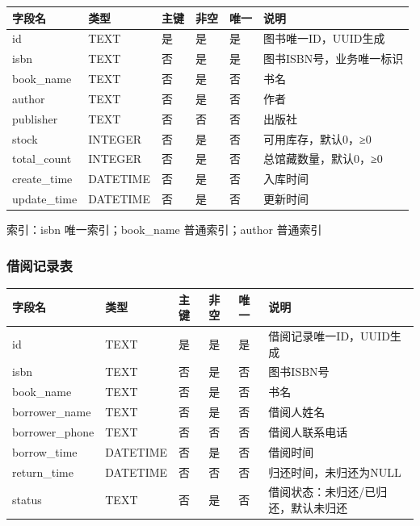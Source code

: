 \documentclass[12pt, a4paper]{article}
\begin{document}
\begin{table}[H]
    \centering
    \begin{tabular}{|l|l|l|l|l|l|}
        \hline
        字段名 & 类型 & 主键 & 非空 & 唯一 & 说明 \\
        \hline
        id & TEXT & 是 & 是 & 是 & 图书唯一ID，UUID生成 \\
        \hline
        isbn & TEXT & 否 & 是 & 是 & 图书ISBN号，业务唯一标识 \\
        \hline
        book\_name & TEXT & 否 & 是 & 否 & 书名 \\
        \hline
        author & TEXT & 否 & 是 & 否 & 作者 \\
        \hline
        publisher & TEXT & 否 & 否 & 否 & 出版社 \\
        \hline
        stock & INTEGER & 否 & 是 & 否 & 可用库存，默认0，≥0 \\
        \hline
        total\_count & INTEGER & 否 & 是 & 否 & 总馆藏数量，默认0，≥0 \\
        \hline
        create\_time & DATETIME & 否 & 是 & 否 & 入库时间 \\
        \hline
        update\_time & DATETIME & 否 & 是 & 否 & 更新时间 \\
        \hline
    \end{tabular}
\end{table}

索引：isbn 唯一索引；book\_name 普通索引；author 普通索引

\subsubsection{借阅记录表}

\begin{table}[H]
    \centering
    \begin{tabular}{|l|l|l|l|l|l|}
        \hline
        字段名 & 类型 & 主键 & 非空 & 唯一 & 说明 \\
        \hline
        id & TEXT & 是 & 是 & 是 & 借阅记录唯一ID，UUID生成 \\
        \hline
        isbn & TEXT & 否 & 是 & 否 & 图书ISBN号 \\
        \hline
        book\_name & TEXT & 否 & 是 & 否 & 书名 \\
        \hline
        borrower\_name & TEXT & 否 & 是 & 否 & 借阅人姓名 \\
        \hline
        borrower\_phone & TEXT & 否 & 否 & 否 & 借阅人联系电话 \\
        \hline
        borrow\_time & DATETIME & 否 & 是 & 否 & 借阅时间 \\
        \hline
        return\_time & DATETIME & 否 & 否 & 否 & 归还时间，未归还为NULL \\
        \hline
        status & TEXT & 否 & 是 & 否 & 借阅状态：未归还/已归还，默认未归还 \\
        \hline
    \end{tabular}
\end{table}
\end{document}
